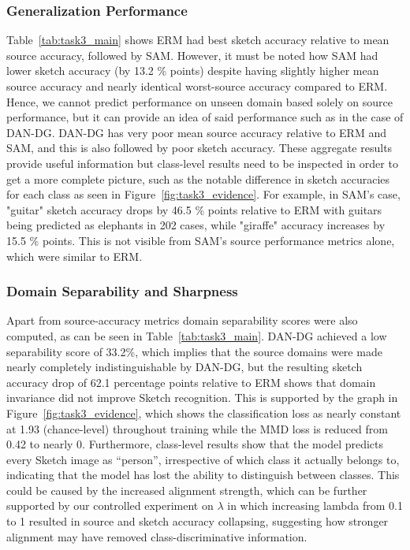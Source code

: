 \documentclass{article}
\begin{document}
\subsubsection{Generalization Performance}
\label{subsubsec:results-t3-performance}

Table~\ref{tab:task3_main} shows ERM had best sketch accuracy relative to mean source accuracy, followed by SAM. However, it must be noted how SAM had lower sketch accuracy (by 13.2 \% points) despite having slightly higher mean source accuracy and nearly identical worst-source accuracy compared to ERM. Hence, we cannot predict performance on unseen domain based solely on source performance, but it can provide an idea of said performance such as in the case of DAN-DG. DAN-DG has very poor mean source accuracy relative to ERM and SAM, and this is also followed by poor sketch accuracy. These aggregate results provide useful information but class-level results need to be inspected in order to get a more complete picture, such as the notable difference in sketch accuracies for each class as seen in Figure~\ref{fig:task3_evidence}. For example, in SAM's case, "guitar" sketch accuracy drops by 46.5 \% points relative to ERM with guitars being predicted as elephants in 202 cases, while "giraffe" accuracy increases by 15.5 \% points. This is not visible from SAM's source performance metrics alone, which were similar to ERM.



\subsubsection{Domain Separability and Sharpness}
\label{subsubsec:results-t3-diagnostics}


Apart from source-accuracy metrics domain separability scores were also computed, as can be seen in Table~\ref{tab:task3_main}. DAN-DG achieved a low separability score of 33.2\%, which implies that the source domains were made nearly completely indistinguishable by DAN-DG, but the resulting sketch accuracy drop of 62.1 percentage points relative to ERM shows that domain invariance did not improve Sketch recognition. This is supported by the graph in Figure~\ref{fig:task3_evidence}, which shows the classification loss as nearly constant at 1.93 (chance-level) throughout training while the MMD loss is reduced from 0.42 to nearly 0. Furthermore, class-level results show that the model predicts every Sketch image as ``person'', irrespective of which class it actually belongs to, indicating that the model has lost the ability to distinguish between classes. This could be caused by the increased alignment strength, which can be further supported by our controlled experiment on $\lambda$ in which increasing lambda from 0.1 to 1 resulted in source and sketch accuracy collapsing, suggesting how stronger alignment may have removed class-discriminative information.
\end{document}
